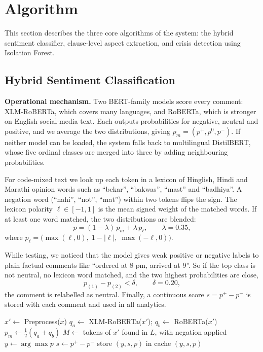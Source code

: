 \documentclass[12pt,a4paper]{report}
\newcommand{\be}{\begin{equation}}
\newcommand{\ee}{\end{equation}}
\begin{document}
\section{Algorithm}
\label{sec:algo}

This section describes the three core algorithms of the system: the hybrid sentiment classifier, clause-level aspect extraction, and crisis detection using Isolation Forest.

\subsection{Hybrid Sentiment Classification}

\textbf{Operational mechanism.} Two BERT-family models score every comment: XLM-RoBERTa, which covers many languages, and RoBERTa, which is stronger on English social-media text. Each outputs probabilities for negative, neutral and positive, and we average the two distributions, giving $p_m = (p^+, p^0, p^-)$. If neither model can be loaded, the system falls back to multilingual DistilBERT, whose five ordinal classes are merged into three by adding neighbouring probabilities.

For code-mixed text we look up each token in a lexicon of Hinglish, Hindi and Marathi opinion words such as ``bekar'', ``bakwas'', ``mast'' and ``badhiya''. A negation word (``nahi'', ``not'', ``mat'') within two tokens flips the sign. The lexicon polarity $\ell \in [-1, 1]$ is the mean signed weight of the matched words. If at least one word matched, the two distributions are blended:
\be
p = (1-\lambda)\,p_m + \lambda\,p_\ell, \qquad \lambda = 0.35,
\ee
where $p_\ell = \big(\max(\ell,0),\; 1-|\ell|,\; \max(-\ell,0)\big)$.

While testing, we noticed that the model gives weak positive or negative labels to plain factual comments like ``ordered at 8 pm, arrived at 9''. So if the top class is not neutral, no lexicon word matched, and the two highest probabilities are close,
\be
p_{(1)} - p_{(2)} < \delta, \qquad \delta = 0.20,
\ee
the comment is relabelled as neutral. Finally, a continuous score $s = p^+ - p^-$ is stored with each comment and used in all analytics.

\begin{algorithm}[H]
\caption{Hybrid Sentiment Classification}
$x' \leftarrow$ Preprocess($x$)\;
$q_a \leftarrow$ XLM-RoBERTa($x'$); $q_b \leftarrow$ RoBERTa($x'$) 
$p_m \leftarrow \tfrac{1}{2}(q_a + q_b)$\;
$M \leftarrow$ tokens of $x'$ found in $L$, with negation applied\;
$y \leftarrow \arg\max p$\;
$s \leftarrow p^+ - p^-$\;
store $(y, s, p)$ in cache\;
\Return $(y, s, p)$\;
\end{algorithm}
\end{document}
